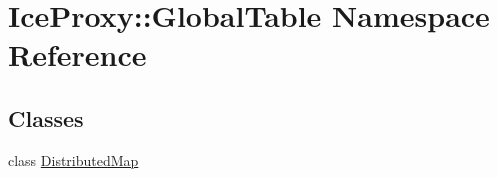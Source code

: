 \hypertarget{namespace_ice_proxy_1_1_global_table}{
\section{IceProxy::GlobalTable Namespace Reference}
\label{namespace_ice_proxy_1_1_global_table}
}
\subsection*{Classes}
\begin{DoxyCompactItemize}
\item 
class \hyperlink{class_ice_proxy_1_1_global_table_1_1_distributed_map}{DistributedMap}
\end{DoxyCompactItemize}

